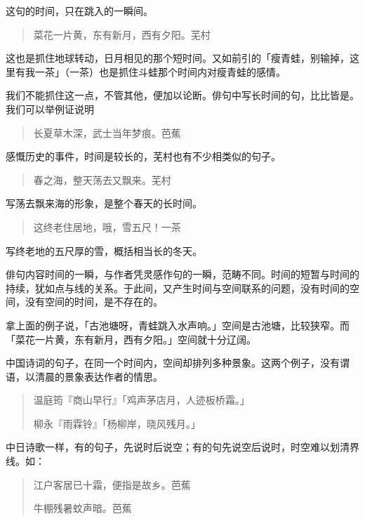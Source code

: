 {    这句的时间，只在跳入的一瞬间。

    \begin{quote}
        菜花一片黄，东有新月，西有夕阳。\hfill 芜村
    \end{quote}

    这也是抓住地球转动，日月相见的那个短时间。又如前引的「瘦青蛙，别输掉，这里有我一茶」（一茶）也是抓住斗蛙那个时间内对瘦青蛙的感情。

    我们不能抓住这一点，不管其他，便加以论断。俳句中写长时间的句，比比皆是。我们可以举例证说明

    \begin{quote}
        长夏草木深，武士当年梦痕。\hfill 芭蕉
    \end{quote}

    感慨历史的事件，时间是较长的，芜村也有不少相类似的句子。

    \begin{quote}
        春之海，整天荡去又飘来。\hfill 芜村
    \end{quote}

    写荡去飘来海的形象，是整个春天的长时间。

    \begin{quote}
        这终老住居地，哦，雪五尺！\hfill 一茶
    \end{quote}

    写终老地的五尺厚的雪，概括相当长的冬天。

    俳句内容时间的一瞬，与作者凭灵感作句的一瞬，范畴不同。时间的短暂与时间的持续，犹如点与线的关系。于此间，又产生时间与空间联系的问题，没有时间的空间，没有空间的时间，是不存在的。

    拿上面的例子说，「古池塘呀，青蛙跳入水声响。」空间是古池塘，比较狭窄。而「菜花一片黄，东有新月，西有夕阳。」空间就十分辽阔。

    中国诗词的句子，在同一个时间内，空间却排列多种景象。这两个例子，没有谓语，以清晨的景象表达作者的情思。
    \begin{quote}
        温庭筠『商山早行』「鸡声茅店月，人迹板桥霜。」

        柳永『雨霖铃』「杨柳岸，晓风残月。」
    \end{quote}

    中日诗歌一样，有的句子，先说时后说空；有的句先说空后说时，时空难以划清界线。如：

    \begin{quote}
        江户客居已十霜，便指是故乡。\hfill 芭蕉

        牛棚残暑蚊声暗。\hfill 芭蕉
    \end{quote}

}
